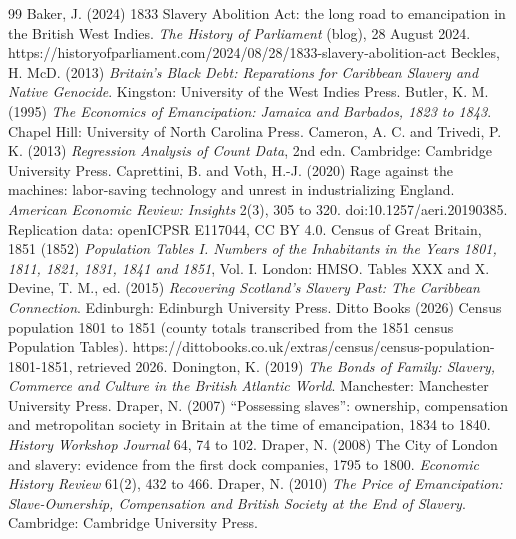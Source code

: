 \documentclass[11pt,a4paper]{article}
\begin{document}
\begin{thebibliography}{99}
 Baker, J. (2024) 1833 Slavery Abolition Act: the long road to emancipation in the British West Indies. \textit{The History of Parliament} (blog), 28 August 2024. https://historyofparliament.com/2024/08/28/1833-slavery-abolition-act
 Beckles, H. McD. (2013) \textit{Britain's Black Debt: Reparations for Caribbean Slavery and Native Genocide}. Kingston: University of the West Indies Press.
 Butler, K. M. (1995) \textit{The Economics of Emancipation: Jamaica and Barbados, 1823 to 1843}. Chapel Hill: University of North Carolina Press.
 Cameron, A. C. and Trivedi, P. K. (2013) \textit{Regression Analysis of Count Data}, 2nd edn. Cambridge: Cambridge University Press.
 Caprettini, B. and Voth, H.-J. (2020) Rage against the machines: labor-saving technology and unrest in industrializing England. \textit{American Economic Review: Insights} 2(3), 305 to 320. doi:10.1257/aeri.20190385. Replication data: openICPSR E117044, CC BY 4.0.
 Census of Great Britain, 1851 (1852) \textit{Population Tables I. Numbers of the Inhabitants in the Years 1801, 1811, 1821, 1831, 1841 and 1851}, Vol. I. London: HMSO. Tables XXX and X.
 Devine, T. M., ed. (2015) \textit{Recovering Scotland's Slavery Past: The Caribbean Connection}. Edinburgh: Edinburgh University Press.
 Ditto Books (2026) Census population 1801 to 1851 (county totals transcribed from the 1851 census Population Tables). https://dittobooks.co.uk/extras/census/census-population-1801-1851, retrieved 2026.
 Donington, K. (2019) \textit{The Bonds of Family: Slavery, Commerce and Culture in the British Atlantic World}. Manchester: Manchester University Press.
 Draper, N. (2007) ``Possessing slaves'': ownership, compensation and metropolitan society in Britain at the time of emancipation, 1834 to 1840. \textit{History Workshop Journal} 64, 74 to 102.
 Draper, N. (2008) The City of London and slavery: evidence from the first dock companies, 1795 to 1800. \textit{Economic History Review} 61(2), 432 to 466.
 Draper, N. (2010) \textit{The Price of Emancipation: Slave-Ownership, Compensation and British Society at the End of Slavery}. Cambridge: Cambridge University Press.

\end{thebibliography}
\end{document}
